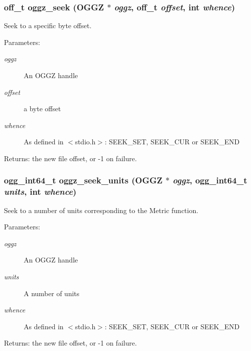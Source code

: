 \subsubsection{\setlength{\rightskip}{0pt plus 5cm}off\_\-t oggz\_\-seek ({\bf OGGZ} $\ast$ {\em oggz}, off\_\-t {\em offset}, int {\em whence})}\label{group__seek__api_a6}


Seek to a specific byte offset. 

\begin{Desc}
\item[Parameters:]
\begin{description}
\item[{\em oggz}]An OGGZ handle \item[{\em offset}]a byte offset \item[{\em whence}]As defined in $<$stdio.h$>$: SEEK\_\-SET, SEEK\_\-CUR or SEEK\_\-END \end{description}
\end{Desc}
\begin{Desc}
\item[Returns:]the new file offset, or -1 on failure. \end{Desc}
\subsubsection{\setlength{\rightskip}{0pt plus 5cm}ogg\_\-int64\_\-t oggz\_\-seek\_\-units ({\bf OGGZ} $\ast$ {\em oggz}, ogg\_\-int64\_\-t {\em units}, int {\em whence})}\label{group__seek__api_a3}


Seek to a number of units corresponding to the Metric function. 

\begin{Desc}
\item[Parameters:]
\begin{description}
\item[{\em oggz}]An OGGZ handle \item[{\em units}]A number of units \item[{\em whence}]As defined in $<$stdio.h$>$: SEEK\_\-SET, SEEK\_\-CUR or SEEK\_\-END \end{description}
\end{Desc}
\begin{Desc}
\item[Returns:]the new file offset, or -1 on failure. \end{Desc}
